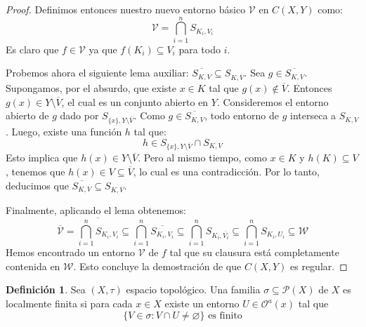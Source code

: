 \documentclass{article}
\theoremstyle{plain}
\theoremstyle{definition}
\newtheorem{definition}{Definición}[section]
\begin{document}
\begin{proof}
    Definimos entonces nuestro nuevo entorno básico \( \mathcal{V} \) en \( C(X, Y) \) como:
    \[
        \mathcal{V} = \bigcap_{i=1}^n S_{K_i, V_i}
    \]
    Es claro que \( f \in \mathcal{V} \) ya que \( f(K_i) \subseteq V_i \) para todo \( i \).

    Probemos ahora el siguiente lema auxiliar: \( \overline{S_{K, V}} \subseteq S_{K, \overline{V}} \).
    Sea \( g \in \overline{S_{K, V}} \). Supongamos, por el absurdo, que existe \( x \in K \) tal que \( g(x) \notin \overline{V} \). Entonces \( g(x) \in Y \setminus \overline{V} \), el cual es un conjunto abierto en \( Y \).
    Consideremos el entorno abierto de \( g \) dado por \( S_{\{x\}, Y \setminus \overline{V}} \).
    Como \( g \in \overline{S_{K, V}} \), todo entorno de \( g \) interseca a \( S_{K, V} \). Luego, existe una función \( h \) tal que:
    \[
        h \in S_{\{x\}, Y \setminus \overline{V}} \cap S_{K, V}
    \]
    Esto implica que \( h(x) \in Y \setminus \overline{V} \). Pero al mismo tiempo, como \( x \in K \) y \( h(K) \subseteq V \), tenemos que \( h(x) \in V \subseteq \overline{V} \), lo cual es una contradicción. Por lo tanto, deducimos que \( \overline{S_{K, V}} \subseteq S_{K, \overline{V}} \).

    Finalmente, aplicando el lema obtenemos:
    \[
        \overline{\mathcal{V}} = \overline{\bigcap_{i=1}^n S_{K_i, V_i}} \subseteq \bigcap_{i=1}^n \overline{S_{K_i, V_i}} \subseteq \bigcap_{i=1}^n S_{K_i, \overline{V_i}} \subseteq \bigcap_{i=1}^n S_{K_i, U_i} \subseteq \mathcal{W}
    \]
    Hemos encontrado un entorno \( \mathcal{V} \) de \( f \) tal que su clausura está completamente contenida en \( \mathcal{W} \). Esto concluye la demostración de que \( C(X, Y) \) es regular.
\end{proof}

\begin{definition}
    Sea \( (X, \tau) \) espacio topológico. Una familia \( \sigma \subseteq \mathcal{P}(X) \) de \( X \) es
    localmente finita si para cada \( x \in X \) existe un entorno \( U \in \mathcal{O}^a(x) \) tal que \[
        \{ V \in \sigma : V \cap U \neq \varnothing \} \text{ es finito}
    \]
\end{definition}
\end{document}
